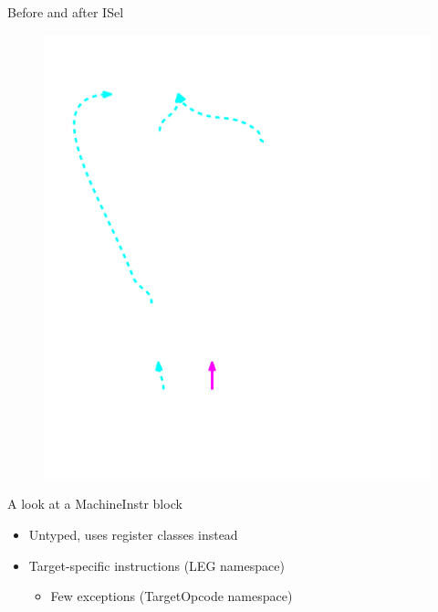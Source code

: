 \begin{frame}{Before and after ISel}
\begin{minipage}[t]{0.49\linewidth}
\begin{figure}
        \includegraphics[width = 1.00\textwidth]{examples/ex1b/ex1b-post-isel.pdf}
    \end{figure}
\end{minipage}

\end{frame}


\begin{frame}{A look at a MachineInstr block}

\begin{itemize}
    \item Untyped, uses register classes instead
    \item Target-specific instructions (LEG namespace)
    \begin{itemize}
        \item Few exceptions (TargetOpcode namespace)
    \end{itemize}
\end{itemize}


\end{frame}
